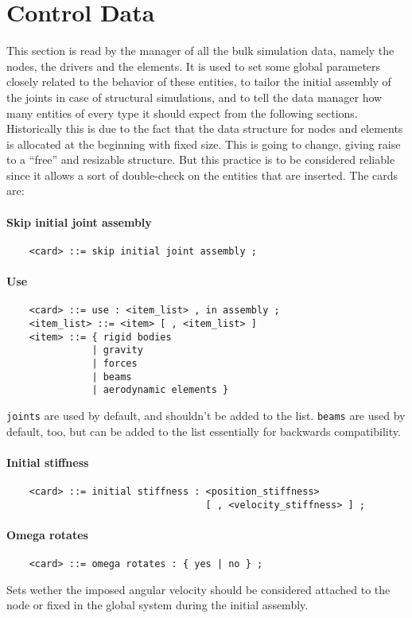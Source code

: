 \chapter{Control Data}
This section is read by the manager of all the bulk simulation data, namely
the nodes, the drivers and the elements. It is used to set some global
parameters closely related to the behavior of these entities, to tailor the
initial assembly of the joints in case of structural simulations, and to
tell the data manager how many entities of every type it should expect from
the following sections. Historically this is due to the fact that the data
structure for nodes and elements is allocated at the beginning with fixed
size. This is going to change, giving raise to a ``free'' and resizable
structure. But this practice is to be considered reliable since it allows a
sort of double-check on the entities that are inserted.
The cards are: 

\subsubsection{Skip initial joint assembly}
\begin{verbatim}
    <card> ::= skip initial joint assembly ;
\end{verbatim}

\subsubsection{Use}
\begin{verbatim}
    <card> ::= use : <item_list> , in assembly ;
    <item_list> ::= <item> [ , <item_list> ]
    <item> ::= { rigid bodies 
               | gravity
               | forces
               | beams
               | aerodynamic elements } 
\end{verbatim}
\texttt{joints} are used by default, and shouldn't be added to the list.
\texttt{beams} are used by default, too, but can be added to the list
essentially for backwards compatibility.

\subsubsection{Initial stiffness}
\begin{verbatim}
    <card> ::= initial stiffness : <position_stiffness>
                                   [ , <velocity_stiffness> ] ;
\end{verbatim}

\subsubsection{Omega rotates}
\begin{verbatim}
    <card> ::= omega rotates : { yes | no } ;
\end{verbatim}
Sets wether the imposed angular velocity should be considered attached 
to the node or fixed in the global system during the initial assembly.

